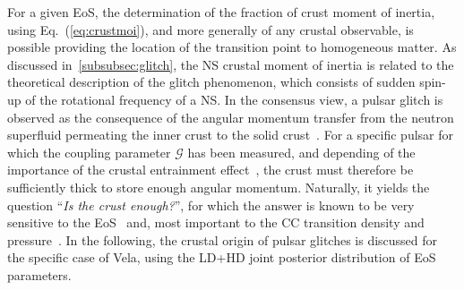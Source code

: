For a given EoS, the determination of the fraction of crust moment of inertia,
using Eq.~(\ref{eq:crustmoi}), 
and more generally of any crustal observable, is possible providing 
the location of the transition point to homogeneous matter.
As discussed in~\ref{subsubsec:glitch}, the NS crustal moment of inertia is
related to the theoretical description of the glitch phenomenon, which consists
of sudden spin-up of the rotational frequency of a NS. In the consensus view,
a pulsar glitch is observed as the consequence of the angular 
momentum transfer from the neutron superfluid permeating the inner crust to the 
solid crust~\cite{Anderson1975}. For a specific pulsar for which the coupling 
parameter $\mathcal{G}$ has been measured, and depending of the importance of 
the crustal entrainment effect~\cite{Chamel2013}, the crust must therefore be 
sufficiently thick to store enough angular momentum. Naturally, it yields the 
question ``\textit{Is the crust enough?}'', for which the answer is known to be 
very sensitive to the EoS~\cite{Andersson2012,Piekarewicz2014} and, most 
important to the CC transition density and pressure~\cite{Carreau2019moi}. In 
the following, the crustal origin of pulsar glitches is discussed for the 
specific case of Vela, using the LD+HD joint posterior distribution of EoS 
parameters.


